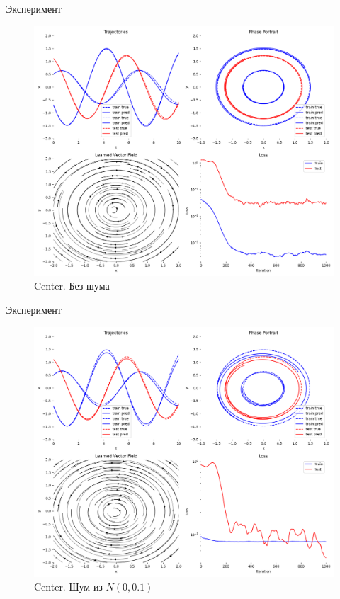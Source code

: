 \documentclass{beamer}
\begin{document}
\begin{frame}{Эксперимент}
\begin{figure}
 \centering
 \includegraphics[width=0.8\linewidth]{center-0.0}
 \caption{Center. Без шума}
\end{figure}
\end{frame}

\begin{frame}{Эксперимент}
\begin{figure}
 \centering
 \includegraphics[width=0.8\linewidth]{center-0.1}
 \caption{Center. Шум из $N(0, 0.1)$}
\end{figure}
\end{frame}
\end{document}
